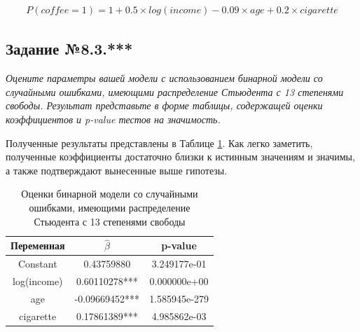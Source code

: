 \documentclass[a4paper,12pt]{article}
\begin{document}
	\begin{align*}
		P(coffee=1) = 1+0.5\times log(income)-0.09\times age+0.2\times cigarette
	\end{align*}
	
	\subsection{Задание №8.3.***}
	\textit{
	Оцените параметры вашей модели с использованием бинарной модели со случайными ошибками, имеющими распределение Стьюдента с 13 степенями свободы. Результат представьте в форме таблицы, содержащей оценки коэффициентов и p-value тестов на значимость.
}

\vspace{0.2cm}

Полученные результаты представлены в Таблице \ref{mymodel}. Как легко заметить, полученные коэффициенты достаточно близки к истинным значениям и значимы, а также подтверждают вынесенные выше гипотезы.

\begin{table}[!h]
	\caption{Оценки бинарной модели со случайными ошибками, имеющими распределение Стьюдента с 13 степенями свободы}
	\label{mymodel}
	\centering
	\begin{tabular}{|c|c|c|}
		\hline
		Переменная  &  $\hat{\beta}$& p-value  \\ 
		\hline
		Constant & 0.43759880&3.249177e-01\\
		\hline
		log(income)&0.60110278***&0.000000e+00\\		
		\hline
		age&-0.09669452***&1.585945e-279\\	
		\hline
		cigarette&0.17861389***&4.985862e-03\\	
		\hline
	\end{tabular}
\end{table}
	          
	
\end{document}
